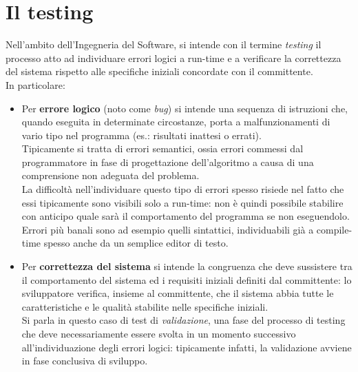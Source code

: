 

\section{Il testing}

Nell'ambito dell'Ingegneria del Software, si intende con il termine \emph{testing} il processo atto ad individuare errori logici a run-time e a verificare la correttezza del sistema rispetto alle specifiche iniziali concordate con il committente.\\
In particolare:

\begin{itemize}
\item Per \textbf{errore logico} (noto come \emph{bug}) si intende una sequenza di istruzioni che, quando eseguita in determinate circostanze, porta a malfunzionamenti di vario tipo nel programma (es.: risultati inattesi o errati).\\
Tipicamente si tratta di errori semantici, ossia errori commessi dal programmatore in fase di progettazione dell'algoritmo a causa di una comprensione non adeguata del problema.\\
La difficoltà nell'individuare questo tipo di errori spesso risiede nel fatto che essi tipicamente sono visibili solo a run-time: non è quindi possibile stabilire con anticipo quale sarà il comportamento del programma se non eseguendolo.
Errori più banali sono ad esempio quelli sintattici, individuabili già a compile-time spesso anche da un semplice editor di testo.\\

\item Per \textbf{correttezza del sistema} si intende la congruenza che deve sussistere tra il comportamento del sistema ed i requisiti iniziali definiti dal committente: lo sviluppatore verifica, insieme al committente, che il sistema abbia tutte le caratteristiche e le qualità stabilite nelle specifiche iniziali.\\
Si parla in questo caso di test di \emph{validazione}, una fase del processo di testing che deve necessariamente essere svolta in un momento successivo all'individuazione degli errori logici: tipicamente infatti, la validazione avviene in fase conclusiva di sviluppo.\\
\end{itemize}

\clearpage

